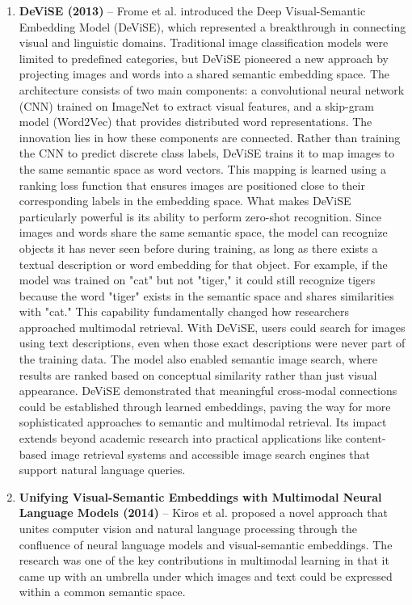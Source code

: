\documentclass[conference]{IEEEtran}
\begin{document}
\begin{enumerate}

\item \textbf{DeViSE (2013)} – Frome et al. \cite{frome2013devise} introduced the Deep Visual-Semantic Embedding Model (DeViSE), which represented a breakthrough in connecting visual and linguistic domains. Traditional image classification models were limited to predefined categories, but DeViSE pioneered a new approach by projecting images and words into a shared semantic embedding space.
The architecture consists of two main components: a convolutional neural network (CNN) trained on ImageNet to extract visual features, and a skip-gram model (Word2Vec) that provides distributed word representations. The innovation lies in how these components are connected. Rather than training the CNN to predict discrete class labels, DeViSE trains it to map images to the same semantic space as word vectors. This mapping is learned using a ranking loss function that ensures images are positioned close to their corresponding labels in the embedding space.
What makes DeViSE particularly powerful is its ability to perform zero-shot recognition. Since images and words share the same semantic space, the model can recognize objects it has never seen before during training, as long as there exists a textual description or word embedding for that object. For example, if the model was trained on "cat" but not "tiger," it could still recognize tigers because the word "tiger" exists in the semantic space and shares similarities with "cat."
This capability fundamentally changed how researchers approached multimodal retrieval. With DeViSE, users could search for images using text descriptions, even when those exact descriptions were never part of the training data. The model also enabled semantic image search, where results are ranked based on conceptual similarity rather than just visual appearance.
DeViSE demonstrated that meaningful cross-modal connections could be established through learned embeddings, paving the way for more sophisticated approaches to semantic and multimodal retrieval. Its impact extends beyond academic research into practical applications like content-based image retrieval systems and accessible image search engines that support natural language queries.


\item \textbf{Unifying Visual-Semantic Embeddings with Multimodal Neural Language Models (2014)} – Kiros et al. \cite{kiros2014unifying} proposed a novel approach that unites computer vision and natural language processing through the confluence of neural language models and visual-semantic embeddings. The research was one of the key contributions in multimodal learning in that it came up with an umbrella under which images and text could be expressed within a common semantic space.


\end{enumerate}
\end{document}
